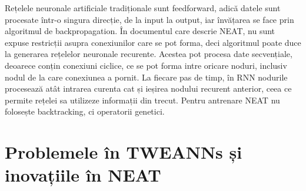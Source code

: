 Rețelele neuronale artificiale tradiționale sunt feedforward, adică datele sunt procesate într-o singura direcție, de la input la output, iar învățarea se face prin algoritmul de backpropagation.
În documentul care descrie NEAT, nu sunt expuse restricții asupra conexiunilor care se pot forma, deci algoritmul poate duce la generarea rețelelor neuronale recurente.
Acestea pot procesa date secvențiale, deoarece conțin conexiuni ciclice, ce se pot forma intre oricare noduri, inclusiv nodul de la care conexiunea a pornit. La fiecare pas de timp, în RNN nodurile procesează atât intrarea curenta cat și ieșirea nodului recurent anterior, ceea ce permite rețelei sa utilizeze informații din trecut.
Pentru antrenare NEAT nu folosește backtracking, ci operatorii genetici.

\section{Problemele în TWEANNs și inovațiile în NEAT}
